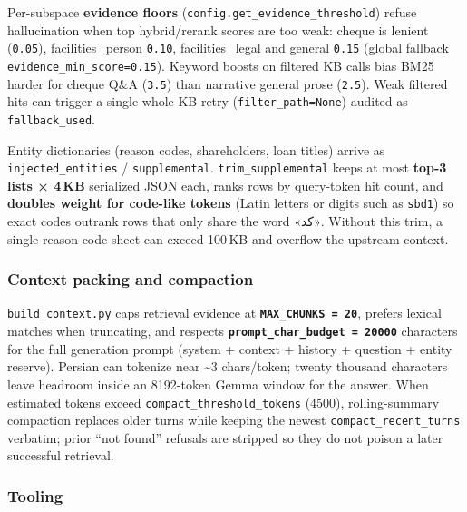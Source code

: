 \documentclass[
  11pt,
]{article}
\begin{document}
Per-subspace \textbf{evidence floors}
(\texttt{config.get\_evidence\_threshold}) refuse hallucination when top
hybrid/rerank scores are too weak: cheque is lenient (\texttt{0.05}),
facilities\_person \texttt{0.10}, facilities\_legal and general
\texttt{0.15} (global fallback \texttt{evidence\_min\_score=0.15}).
Keyword boosts on filtered KB calls bias BM25 harder for cheque Q\&A
(\texttt{3.5}) than narrative general prose (\texttt{2.5}). Weak
filtered hits can trigger a single whole-KB retry
(\texttt{filter\_path=None}) audited as \texttt{fallback\_used}.

Entity dictionaries (reason codes, shareholders, loan titles) arrive as
\texttt{injected\_entities} / \texttt{supplemental}.
\texttt{trim\_supplemental} keeps at most \textbf{top-3 lists × 4\,KB}
serialized JSON each, ranks rows by query-token hit count, and
\textbf{doubles weight for code-like tokens} (Latin letters or digits
such as \texttt{sbd1}) so exact codes outrank rows that only share the
word «کد». Without this trim, a single reason-code sheet can exceed
100\,KB and overflow the upstream context.

\subsubsection{Context packing and
compaction}\label{context-packing-and-compaction}

\texttt{build\_context.py} caps retrieval evidence at
\textbf{\texttt{MAX\_CHUNKS\ =\ 20}}, prefers lexical matches when
truncating, and respects
\textbf{\texttt{prompt\_char\_budget\ =\ 20000}} characters for the full
generation prompt (system + context + history + question + entity
reserve). Persian can tokenize near \textasciitilde3 chars/token; twenty
thousand characters leave headroom inside an 8192-token Gemma window for
the answer. When estimated tokens exceed
\texttt{compact\_threshold\_tokens} (4500), rolling-summary compaction
replaces older turns while keeping the newest
\texttt{compact\_recent\_turns} verbatim; prior ``not found'' refusals
are stripped so they do not poison a later successful retrieval.

\subsubsection{Tooling}\label{tooling-1}
\end{document}
